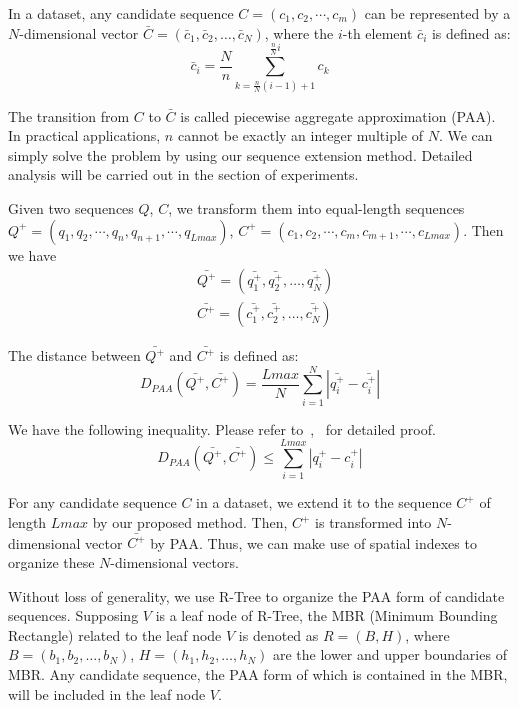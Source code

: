 \documentclass[10pt,journal,compsoc]{IEEEtran}
\begin{document}
In a dataset, any candidate sequence $C=(c_1, c_2, \cdots, c_m)$ can be represented by a $N$-dimensional vector $\bar{C} = (\bar{c}_1, \bar{c}_2,\ldots,\bar{c}_N)$,
where the $i$-th element $\bar{c}_i$ is defined as:
\begin{equation}\label{eq:PAA}
 \bar{c}_i= \frac{N}{n} \sum\limits_{k=\frac{n}{N}(i-1)+1}^{\frac{n}{N}i} c_k
\end{equation}

The transition from $C$ to $\bar{C}$ is called piecewise aggregate approximation (PAA).
In practical applications, $n$ cannot be exactly an integer multiple of $N$.
We can simply solve the problem by using our sequence extension method.
Detailed analysis will be carried out in the section of experiments.

Given two sequences $Q$, $C$,
we transform them into equal-length sequences
$Q^+=(q_1, q_2, \cdots, q_n, q_{n+1},\cdots,q_{Lmax})$, $C^+=(c_1, c_2, \cdots, c_m, c_{m+1}, \cdots,c_{Lmax})$.
Then we have
\begin{equation}\label{eq:extented paa}
\begin{split}
   & \bar{Q^+}=(\bar{q^+_1}, \bar{q^+_2},\ldots,\bar{q^+_N}) \\
   & \bar{C^+}=(\bar{c^+_1}, \bar{c^+_2},\ldots,\bar{c^+_N})
\end{split}
\end{equation}

The distance between $\bar{Q^+}$ and $\bar{C^+}$ is defined as:
\begin{equation}\label{eq:PAA distance}
 D_{PAA}(\bar{Q^+},\bar{C^+})=
 \frac{Lmax}{N} \sum\limits_{i=1}^{N} \left| \bar{q^+_i}-\bar{c^+_i} \right|
\end{equation}

We have the following inequality. Please refer to~\cite{Keogh2001Dimensionality},~\cite{Yi2000Fast} for detailed proof.
\begin{equation}\label{eq:PAA distance proof}
 D_{PAA}(\bar{Q^+},\bar{C^+}) \leq
  \sum\limits_{i=1}^{Lmax} \left| q^+_i-c^+_i \right|
\end{equation}


For any candidate sequence $C$ in a dataset,
we extend it to the sequence $C^+$ of length $Lmax$ by our proposed method.
Then, $C^+$ is transformed into $N$-dimensional vector $\bar{C^+}$ by PAA.
Thus, we can make use of spatial indexes to organize these $N$-dimensional vectors.

Without loss of generality,
we use R-Tree to organize the PAA form of candidate sequences.
Supposing $V$ is a leaf node of R-Tree,
the MBR (Minimum Bounding Rectangle) related to the leaf node $V$ is denoted as $R=(B,H)$,
where $B=(b_1,b_2,\ldots,b_N)$, $H=(h_1,h_2,\ldots,h_N)$
are the lower and upper boundaries of MBR.
Any candidate sequence,
the PAA form of which is contained in the MBR,
will be included in the leaf node $V$.
\end{document}
